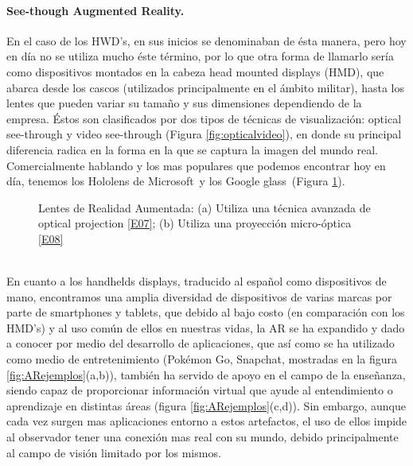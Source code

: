 \documentclass[a4paper,openright,12pt]{report}
\begin{document}
\paragraph{See-though Augmented Reality.}
En el caso de los HWD's, en sus inicios se denominaban de ésta manera, pero hoy en día no se utiliza mucho éste término, por lo que otra forma de llamarlo sería como dispositivos montados en la cabeza head mounted displays (HMD), que abarca desde los cascos (utilizados principalmente en el ámbito militar), hasta los lentes que pueden variar su tamaño y sus dimensiones dependiendo de la empresa. Éstos son clasificados por dos tipos de técnicas de visualización: optical see-through y video see-through (Figura \ref{fig:opticalvideo}), en donde su principal diferencia radica en la forma en la que se captura la imagen del mundo real. Comercialmente hablando y los mas populares que podemos encontrar hoy en día, tenemos los Hololens de Microsoft\textcopyright\ y los Google glass\textcopyright\ (Figura \ref{fig:lentesAR}).
\begin{figure}[thbp]
	\centering
	\caption[Lentes de Realidad Aumentada]{Lentes de Realidad Aumentada: (a) Utiliza una técnica avanzada de optical projection \hyperlink{e07}{[E07]}; (b) Utiliza una proyección micro-óptica \hyperlink{e08}{[E08]}} \label{fig:lentesAR}
\end{figure}\\
En cuanto a los handhelds displays, traducido al español como dispositivos de mano, encontramos una amplia diversidad de dispositivos de varias marcas por parte de smartphones y tablets, que debido al bajo costo (en comparación con los HMD's) y al uso común de ellos en nuestras vidas, la AR se ha expandido y dado a conocer por medio del desarrollo de aplicaciones, que así como se ha utilizado como medio de entretenimiento (Pokémon Go\textcopyright, Snapchat\textcopyright, mostradas en la figura \ref{fig:ARejemplos}(a,b)), también ha servido de apoyo en el campo de la enseñanza, siendo capaz de proporcionar información virtual que ayude al entendimiento o aprendizaje en distintas áreas (figura \ref{fig:ARejemplos}(c,d)). Sin embargo, aunque cada vez surgen mas aplicaciones entorno a estos artefactos, el uso de ellos impide al observador tener una conexión mas real con su mundo, debido principalmente al campo de visión limitado por los mismos.\\
\end{document}
